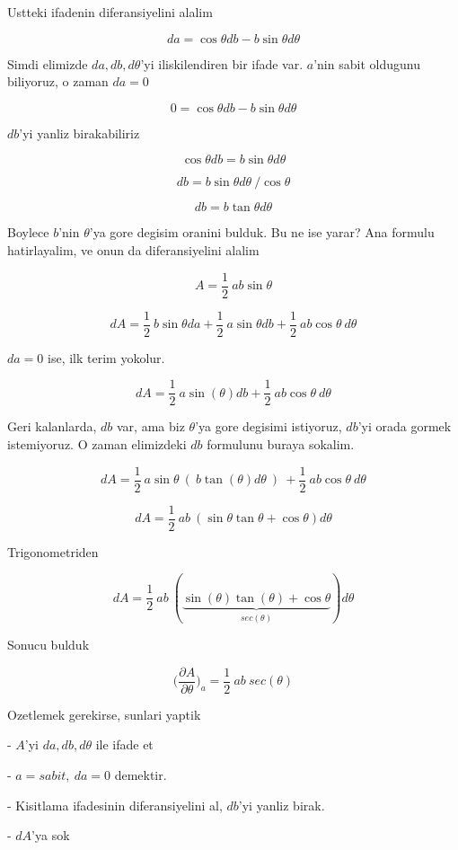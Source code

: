\documentclass[12pt,fleqn]{article}\usepackage{../common}
\begin{document}
Ustteki ifadenin diferansiyelini alalim

\[ da = \cos \theta db - b \sin\theta d\theta \]

Simdi elimizde $da,db,d\theta$'yi iliskilendiren bir ifade var. $a$'nin
sabit oldugunu biliyoruz, o zaman $da=0$

\[ 0 = \cos \theta db - b \sin \theta d\theta \]

$db$'yi yanliz birakabiliriz

\[ \cos\theta db = b \sin\theta d\theta \]

\[ db = b \sin\theta d\theta \ / \cos\theta \]

\[ db = b \tan\theta d\theta  \]

Boylece $b$'nin $\theta$'ya gore degisim oranini bulduk. Bu ne ise yarar?
Ana formulu hatirlayalim, ve onun da diferansiyelini alalim

\[ A = \frac{1}{2} \ ab \sin\theta \]

\[ dA = \frac{1}{2} \ b \sin\theta da + 
\frac{1}{2} \ a \sin\theta db + 
\frac{1}{2} \ ab \cos\theta \ d\theta
 \]

$da = 0$ ise, ilk terim yokolur. 

\[ dA = 
\frac{1}{2} \ a \sin(\theta) db + 
\frac{1}{2} \ ab \cos \theta \ d\theta
 \]

Geri kalanlarda, $db$ var, ama biz $\theta$'ya gore degisimi istiyoruz,
$db$'yi orada gormek istemiyoruz. O zaman elimizdeki $db$ formulunu buraya
sokalim. 

\[ dA =  
\frac{1}{2} \ a \sin\theta \ ( \ b \tan(\theta) d\theta \ ) \ + 
\frac{1}{2} \ ab \cos\theta \ d\theta
\]

\[ dA =  
\frac{1}{2} \ ab \ (\sin\theta \tan\theta +  \cos\theta )d\theta
\]

Trigonometriden 

\[ dA =  
\frac{1}{2} \ ab \ (
\underbrace{\sin(\theta) \tan(\theta) +  \cos \theta}_{sec(\theta)}
)d\theta
\]

Sonucu bulduk 

\[ \bigg( \frac{\partial A}{\partial \theta} \bigg)_{a} = 
\frac{1}{2} \ ab \ sec(\theta)
 \]

Ozetlemek gerekirse, sunlari yaptik

- $A$'yi $da,db,d\theta$ ile ifade et

- $a=sabit, \ da=0$ demektir.

- Kisitlama ifadesinin diferansiyelini al, $db$'yi yanliz birak. 

- $dA$'ya sok
\end{document}
